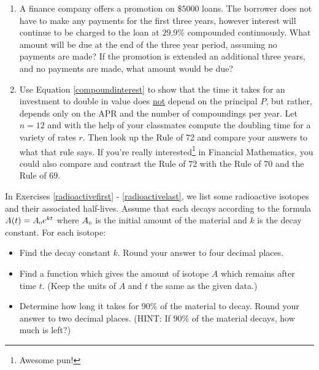 \begin{enumerate}
\begin{enumerate}
\end{enumerate}


\item  A finance company offers a promotion on $\$5000$ loans.  The borrower does not have to make any payments for the first three years, however interest will continue to be charged to the loan at $29.9 \%$ compounded continuously.  What amount will be due at the end of the three year period, assuming no payments are made?  If the promotion is extended an additional three years, and no payments are made, what amount would be due?

\item Use Equation \ref{compoundinterest} to show that the time it takes for an investment to double in value does \underline{not} depend on the principal $P$, but rather, depends only on the APR and the number of compoundings per year.  Let $n = 12$ and with the help of your classmates compute the doubling time for a variety of rates $r$.  Then look up the Rule of 72 and compare your answers to what that rule says.  If you're really interested\footnote{Awesome pun!} in Financial Mathematics, you could also compare and contrast the Rule of 72 with the Rule of 70 and the Rule of 69.

\setcounter{HW}{\value{enumi}}
\end{enumerate}

In Exercises \ref{radioactivefirst} - \ref{radioactivelast},  we list some radioactive isotopes and their associated half-lives.  Assume that each decays according to the formula $A(t) = A_{\text{\tiny $0$}}e^{kt}$ where $A_{\text{\tiny $0$}}$ is the initial amount of the material and $k$ is the decay constant. For each isotope:

\begin{itemize}

\item  Find the decay constant $k$.  Round your answer to four decimal places.

\item  Find a function which gives the amount of isotope $A$ which remains after time $t$.  (Keep the units of $A$ and $t$ the same as the given data.)

\item  Determine how long it takes for $90 \%$ of the material to decay.  Round your answer to two decimal places.  (HINT:  If $90 \%$ of the material decays, how much is left?)

\end{itemize}


